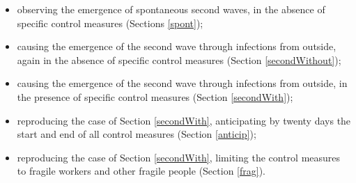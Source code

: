 \documentclass[graybox]{svmult}
\begin{document}
\begin{itemize}

\item observing the emergence of spontaneous second waves, in the absence of specific control measures (Sections \ref{spont});

\item causing the emergence of the second wave through infections from outside, again in the absence of specific control measures (Section \ref{secondWithout});

\item causing the emergence of the second wave through infections from outside, in the presence of specific control measures (Section \ref{secondWith});

\item reproducing the case of Section \ref{secondWith}, anticipating by twenty days the start and end of all control measures (Section \ref{anticip});

\item reproducing the case of Section \ref{secondWith}, limiting the control measures to fragile workers and other fragile people (Section \ref{frag}).

\end{itemize}
\end{document}
